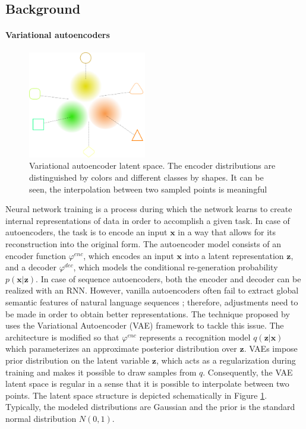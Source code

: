\subsection{Background}\paragraph{Variational autoencoders}
\label{04:latent-models}
\begin{figure}[t]
    \centering
    \includegraphics[width=0.46\textwidth]{images/VAE.png}
    \caption{Variational autoencoder latent space. The encoder distributions are distinguished by colors and different classes by shapes. It can be seen, the interpolation between two sampled points is meaningful}
    \label{fig:vae}
\end{figure}
Neural network training is a process during which the network learns to create internal representations of data in order to accomplish a given task.
In case of autoencoders, the task is to encode an input $\mathbf{x}$ in a way that allows for its reconstruction into the original form.
The autoencoder model consists of an encoder function $\varphi^{enc}$, which encodes an input $\mathbf{x}$ into a latent representation $\mathbf{z}$, and a decoder $\varphi^{dec}$, which models the conditional re-generation probability $p(\mathbf{x}|\mathbf{z})$.
In case of sequence autoencoders, both the encoder and decoder can be realized with an RNN.
However, vanilla autoencoders often fail to extract global semantic features of natural language sequences \cite{bowman2015generating}; therefore, adjustments need to be made in order to obtain better representations.
The technique proposed by \citet{kingma2013auto} uses the Variational Autoencoder (VAE) framework to tackle this issue.
The architecture is modified so that $\varphi^{enc}$ represents a recognition model $q(\mathbf{z}|\mathbf{x})$ which parameterizes an approximate posterior distribution over $\mathbf{z}$.
VAEs impose prior distribution on the latent variable $\mathbf{z}$, which acts as a regularization during training and makes it possible to draw samples from $q$.
Consequently, the VAE latent space is regular in a sense that it is possible to interpolate between two points.
The latent space structure is depicted schematically in Figure \ref{fig:vae}.
Typically, the modeled distributions are Gaussian and the prior is the standard normal distribution $N(0, 1)$.

